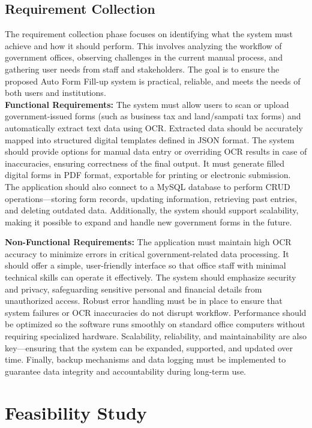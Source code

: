\documentclass[12pt,a4paper]{report}
\begin{document}
\subsection{Requirement Collection}
The requirement collection phase focuses on identifying what the system must achieve and how it should perform. This involves analyzing the workflow of government offices, observing challenges in the current manual process, and gathering user needs from staff and stakeholders. The goal is to ensure the proposed Auto Form Fill-up system is practical, reliable, and meets the needs of both users and institutions.\\

\textbf{Functional Requirements:}
The system must allow users to scan or upload government-issued forms (such as business tax and land/sampati tax forms) and automatically extract text data using OCR. Extracted data should be accurately mapped into structured digital templates defined in JSON format. The system should provide options for manual data entry or overriding OCR results in case of inaccuracies, ensuring correctness of the final output. It must generate filled digital forms in PDF format, exportable for printing or electronic submission. The application should also connect to a MySQL database to perform CRUD operations—storing form records, updating information, retrieving past entries, and deleting outdated data. Additionally, the system should support scalability, making it possible to expand and handle new government forms in the future.

\textbf{Non-Functional Requirements:}
The application must maintain high OCR accuracy to minimize errors in critical government-related data processing. It should offer a simple, user-friendly interface so that office staff with minimal technical skills can operate it effectively. The system should emphasize security and privacy, safeguarding sensitive personal and financial details from unauthorized access. Robust error handling must be in place to ensure that system failures or OCR inaccuracies do not disrupt workflow. Performance should be optimized so the software runs smoothly on standard office computers without requiring specialized hardware. Scalability, reliability, and maintainability are also key—ensuring that the system can be expanded, supported, and updated over time. Finally, backup mechanisms and data logging must be implemented to guarantee data integrity and accountability during long-term use.
\section{Feasibility Study}
\end{document}
